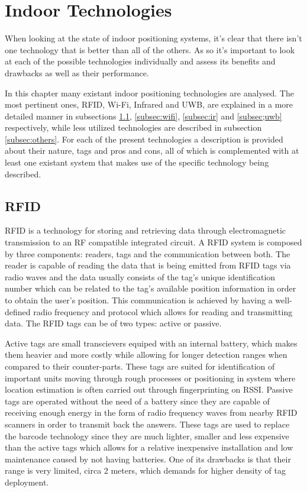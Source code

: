 \section{Indoor Technologies}
\label{sec:indoortech}

When looking at the state of indoor positioning systems, it's clear that there isn't one technology that is better than all of the others. As so it's important to look at each of the possible technologies individually and assess its benefits and drawbacks as well as their performance.

In this chapter many existant indoor positioning technologies are analysed. The most pertinent ones, RFID, Wi-Fi, Infrared and UWB, are explained in a more detailed manner in subsections \ref{subsec:rfid}, \ref{subsec:wifi}, \ref{subsec:ir} and \ref{subsec;uwb} respectively, while less utilized technologies are described in subsection \ref{subsec:others}. For each of the present technologies a description is provided about their nature, tags and pros and cons, all of which is complemented with at least one existant system that makes use of the specific technology being described. 


\subsection{RFID}
\label{subsec:rfid}

\ac{RFID} is a technology for storing and retrieving data through electromagnetic transmission to an RF compatible integrated circuit. A \ac{RFID} system is composed by three components: readers, tags and the communication between both. The reader is capable of reading the data that is being emitted from \ac{RFID} tags via radio waves and the data usually consists of the tag's unique identification number which can be related to the tag's available position information in order to obtain the user's position. This communication is achieved by having a well-defined radio frequency and protocol which allows for reading and transmitting data. The \ac{RFID} tags can be of two types: active or passive.

Active tags are small transcievers equiped with an internal battery, which makes them heavier and more costly while allowing for longer detection ranges when compared to their counter-parts. These tags are suited for identification of important units moving through rough processes or positioning in system where location estimation is often carried out through fingerprinting on \ac{RSSI}.
Passive tags are operated without the need of a battery since they are capable of receiving enough energy in the form of radio frequency waves from nearby \ac{RFID} scanners in order to transmit back the answers. These tags are used to replace the barcode technology since they are much lighter, smaller and less expensive than the active tags which allows for a relative inexpensive installation and low maintenance caused by not having batteries. One of its drawbacks is that their range is very limited, circa 2 meters, which demands for higher density of tag deployment.

